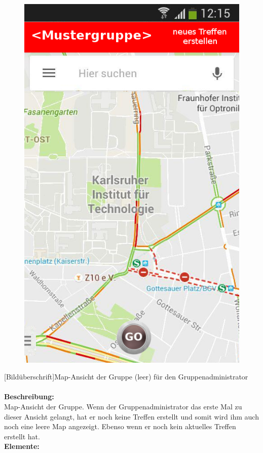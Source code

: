 \begin{figure}
	\includegraphics[scale =1]{resources/images/map_leer_Admin.png}
\end{figure}
[Bildüberschrift]Map-Ansicht der Gruppe (leer) für den Gruppenadministrator\\ \\
\textbf{Beschreibung:}\\
Map-Ansicht der Gruppe. Wenn der Gruppenadministrator das erste Mal zu dieser Ansicht gelangt, hat er noch keine Treffen erstellt und somit wird ihm auch noch eine leere Map angezeigt. Ebenso wenn er noch kein aktuelles Treffen erstellt hat.\\
\textbf{Elemente:}\\

